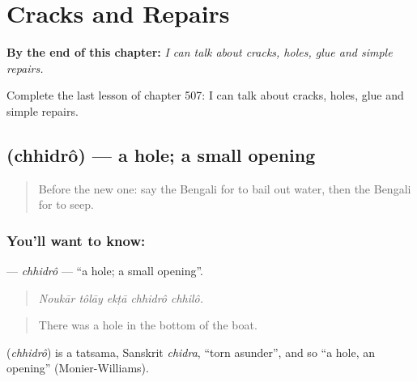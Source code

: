 
\chapter{Cracks and Repairs}
\label{ch:bn-cracks-and-repairs}

\begin{chapteropening}
\textbf{By the end of this chapter:} \emph{I can talk about cracks, holes, glue and simple repairs.}

Complete the last lesson of chapter 507: I can talk about cracks, holes, glue and simple repairs.
\end{chapteropening}

\section[\texorpdfstring{\bn{ছিদ্র} (chhidrô)}{ছিদ্র (chhidrô)}]{ (chhidrô) — a hole; a small opening}

\label{lesson:BN-C507-chhidro}



\begin{quote}
Before the new one: say the Bengali for to bail out water, then the Bengali for to seep.
\end{quote}

\subsection*{You'll want to know: }
\textbf{} — \emph{chhidrô} — \textquotedblleft{}a hole; a small opening\textquotedblright{}.

\begin{quote}
    
\end{quote}

\begin{quote}
\emph{Noukār tôlāy ekṭā chhidrô chhilô.}
\end{quote}

\begin{quote}
There was a hole in the bottom of the boat.
\end{quote}

\begin{cousinweb}
\textbf{} (\emph{chhidrô}) is a tatsama, Sanskrit \emph{chidra}, \textquotedblleft{}torn asunder\textquotedblright{}, and so \textquotedblleft{}a hole, an opening\textquotedblright{} (Monier-Williams).
\end{cousinweb}

